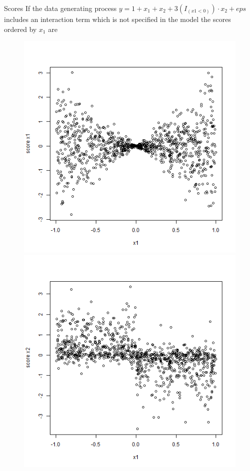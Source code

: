 \documentclass[9pt, xcolor=table]{beamer}
\begin{document}
\begin{frame}{Scores}
If the data generating process $y = 1 + x_1 + x_2 + 3(I_{(x1<0)}) \cdot x_2 + eps$ includes an interaction term which is not specified in the model the scores ordered by $x_{1}$ are
\begin{figure}
    \centering
    \begin{minipage}{0.45\textwidth}
        \centering
        \includegraphics[width=1\textwidth]{Figures/Scores/misspecified_scores_x1_x1.png} 
    \end{minipage}\hfill
    \begin{minipage}{0.45\textwidth}
        \centering
        \includegraphics[width=1\textwidth]{Figures/Scores/misspecified_scores_x2_x1.png} 
    \end{minipage}
\end{figure}
    

\end{frame}
\end{document}
